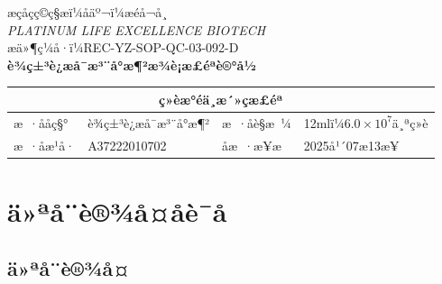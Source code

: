 \documentclass[UTF8,10pt,a4paper,fontset=fandol]{ctexart}
\newcommand{\fieldvalue}[1]{#1}
\newcommand{\handwritten}[1]{#1}
\begin{document}
\newpage

\begin{center}
æçåçç©ç§æï¼åäº¬ï¼æéå¬å¸\\
\textit{PLATINUM LIFE EXCELLENCE BIOTECH}\\[2mm]
æä»¶ç¼å·ï¼REC-YZ-SOP-QC-03-092-D\\
\textbf{è¾ç±³è¿æå¯æ³¨å°æ¶²æ¾è¡æ£éªè®°å½}
\end{center}

\begin{tabularx}{\textwidth}{|l|X|l|X|}
\hline
\multicolumn{4}{|c|}{ç»èæ°éä¸æ´»çæ£éª}\\
\hline
æ ·ååç§° &
\fieldvalue{è¾ç±³è¿æå¯æ³¨å°æ¶²} &
æ ·åè§æ ¼ &
\fieldvalue{12mlï¼$6.0\times 10^{7}$ä¸ªç»è}\\
\hline
æ ·åæ¹å· &
\fieldvalue{\handwritten{A37222010702}} &
åæ ·æ¥æ &
\fieldvalue{\handwritten{2025å¹´07æ13æ¥}}\\
\hline
\end{tabularx}

\section{ä»ªå¨è®¾å¤åè¯å}

\subsection{ä»ªå¨è®¾å¤}
\end{document}

